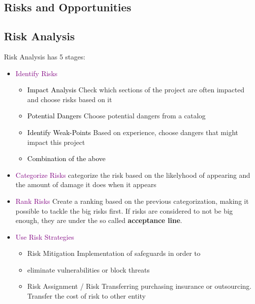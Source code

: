 \documentclass[main.tex,fontsize=12pt,paper=a4,paper=landscape,DIV=calc,]{scrartcl}
\begin{document}
\begin{multicols*}{2}
\section{Risks and Opportunities}

\subsection{Risk Analysis}
Risk Analysis has 5 stages: \newline
\begin{itemize}
\item \textcolor{purple}{Identify Risks}
  \begin{itemize}
  \item \textcolor{black}{Impact Analysis}\newline
    Check which sections of the project are often impacted and choose risks based on it
  \item \textcolor{black}{Potential Dangers}\newline
    Choose potential dangers from a catalog
  \item \textcolor{black}{Identify Weak-Points}\newline
    Based on experience, choose dangers that might impact this project
  \item \textcolor{black}{Combination of the above}
  \end{itemize} 
\item \textcolor{purple}{Categorize Risks}
  categorize the risk based on the likelyhood of appearing and the amount of damage it does when it appears
\item \textcolor{purple}{Rank Risks}\newline 
  Create a ranking based on the previous categorization, making it possible to tackle the big risks first.\newline
  If risks are considered to not be big enough, they are under the so called \textbf{acceptance line}.
\item \textcolor{purple}{Use Risk Strategies}\newline 
\begin{itemize}
\item Risk Mitigation Implementation of safeguards in order to
\item eliminate vulnerabilities or block threats
\item Risk Assignment / Risk Transferring \newline
  purchasing insurance or outsourcing. Transfer the cost of risk to other entity

\end{itemize}
\end{itemize}
\end{multicols*}
\end{document}
